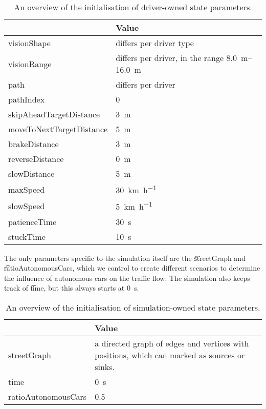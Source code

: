 \begin{table}
	\centering
	\begin{tabularx}{\textwidth}{>{\ttfamily}lX}
		\toprule
		\normalfont{Parameter}	& Value \\  
		\midrule
		visionShape 			
			& differs per driver type \\
		visionRange 			
			& differs per driver, in the range \SIrange{8.0}{16.0}{\meter} \\
		path
			& differs per driver \\
		pathIndex
			& 0 \\
		skipAheadTargetDistance
			& \si{3 \meter} \\
		moveToNextTargetDistance
			& \si{5 \meter} \\
		brakeDistance
			& \si{3 \meter} \\
		reverseDistance
			& \si{0 \meter} \\
		slowDistance
			& \si{5 \meter} \\
		maxSpeed
			& \si{30 \kilo\meter\per\hour}\\
		slowSpeed
			& \si{5 \kilo\meter\per\hour} \\
		patienceTime
			& \si{30 \second} \\
		stuckTime
			& \si{10 \second} \\
		\bottomrule
	\end{tabularx}
	\caption{An overview of the initialisation of driver-owned state parameters.}
	\label{tab:par:method:model:details:init:driver:value}
\end{table}

The only parameters specific to the simulation itself are the \t{streetGraph} and \t{ratioAutonomousCars}, which we control to create different scenarios to determine the influence of autonomous cars on the traffic flow. The simulation also keeps track of \t{time}, but this always starts at \SI{0}{\second}.

\begin{table}
	\centering
	\begin{tabularx}{\textwidth}{>{\ttfamily}lX}
		\toprule
		\normalfont{Parameter}	& Value \\  
		\midrule
		streetGraph
			& a directed graph of edges and vertices with positions, which can marked as sources or sinks. \\
		time 
			& \si{0 \second} \\
		ratioAutonomousCars
			& 0.5 \\
		\bottomrule
	\end{tabularx}
	\caption{An overview of the initialisation of simulation-owned state parameters.}
	\label{tab:par:method:model:details:init:simulation:value}
\end{table}

